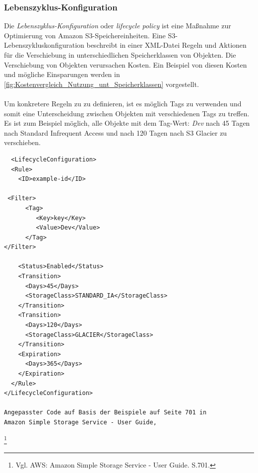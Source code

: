 \subsubsection{Lebenszyklus-Konfiguration}\label{ssec:Lebenszyklus-Konfiguration}
Die \textit{Lebenszyklus-Konfiguration} oder \textit{lifecycle policy} ist eine Maßnahme zur Optimierung von Amazon S3-Speichereinheiten. Eine S3-Lebenszykluskonfiguration beschreibt in einer XML-Datei Regeln und Aktionen für die Verschiebung in unterschiedlichen Speicherklassen von Objekten. Die Verschiebung von Objekten verursachen Kosten. Ein Beispiel von diesen Kosten und mögliche Einsparungen werden in \autoref{fig:Kostenvergleich_Nutzung_unt_Speicherklassen} vorgestellt.
\\\\
Um konkretere Regeln zu zu definieren, ist es möglich Tags zu verwenden und somit eine Unterscheidung zwischen Objekten mit verschiedenen Tags zu treffen. Es ist zum Beispiel möglich, alle Objekte mit dem Tag-Wert: \textit{Dev} nach 45 Tagen nach Standard Infrequent Access und nach 120 Tagen nach S3 Glacier zu verschieben.
\begin{lstlisting}
  <LifecycleConfiguration>
  <Rule>
    <ID>example-id</ID>
    
 <Filter>
      <Tag>
         <Key>key</Key>
         <Value>Dev</Value>
      </Tag>
</Filter>

    <Status>Enabled</Status>
    <Transition>
      <Days>45</Days>
      <StorageClass>STANDARD_IA</StorageClass>
    </Transition>
    <Transition>
      <Days>120</Days>
      <StorageClass>GLACIER</StorageClass>
    </Transition>
    <Expiration>
      <Days>365</Days>
    </Expiration>
  </Rule>
</LifecycleConfiguration>

Angepasster Code auf Basis der Beispiele auf Seite 701 in 
Amazon Simple Storage Service - User Guide, 
\end{lstlisting}
\footnote{Vgl. AWS: Amazon Simple Storage Service - User Guide. S.701.\cite{AMZ18}}\\

